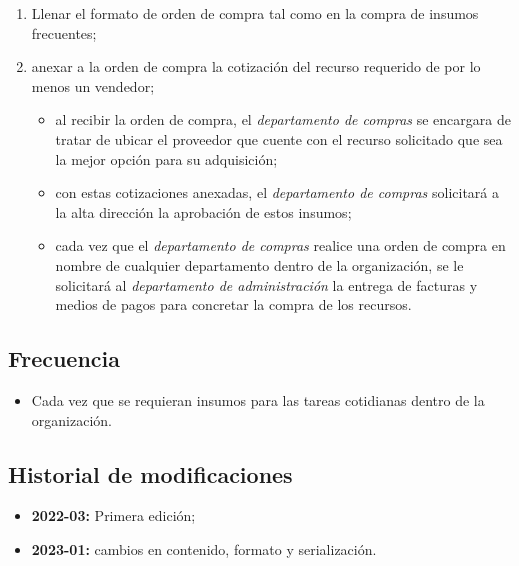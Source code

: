 \begin{enumerate}
	\item Llenar el formato de orden de compra tal como en la compra de insumos frecuentes;
	\item anexar a la orden de compra la cotización del recurso requerido de por lo menos un vendedor;
	\begin{itemize}
		\item al recibir la orden de compra, el \emph{departamento de compras} se encargara de tratar de ubicar el proveedor que cuente con el recurso solicitado que sea la mejor opción para su adquisición;
		\item con estas cotizaciones anexadas, el \emph{departamento de compras} solicitará a la alta dirección la aprobación de estos insumos;
		\item cada vez que el \emph{departamento de compras} realice una orden de compra en nombre de cualquier departamento dentro de la organización, se le solicitará al \emph{departamento de administración} la entrega de facturas y medios de pagos para concretar la compra de los recursos.
	\end{itemize}
\end{enumerate}

\subsection{Frecuencia}

\begin{itemize}
	\item Cada vez que se requieran insumos para las tareas cotidianas dentro de la organización.
\end{itemize}

\subsection{Historial de modificaciones}

\begin{itemize}
	\item \textbf{2022-03:} Primera edición;
	\item \textbf{2023-01:} cambios en contenido, formato y serialización.
\end{itemize}
